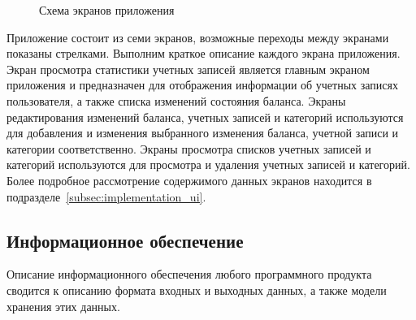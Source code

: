 \begin{figure}[h!]
  \centering
  \caption{Схема экранов приложения}
  \label{fig:design_activities}
\end{figure}

Приложение состоит из семи экранов, возможные переходы между экранами
показаны стрелками. Выполним краткое описание каждого экрана приложения.
Экран просмотра статистики учетных записей является главным экраном приложения
и предназначен для отображения информации об учетных записях пользователя,
а также списка изменений состояния баланса.
Экраны редактирования изменений баланса, учетных записей и категорий
используются для добавления и изменения выбранного изменения баланса,
учетной записи и категории соответственно.
Экраны просмотра списков учетных записей и категорий используются
для просмотра и удаления учетных записей и категорий.
Более подробное рассмотрение содержимого данных экранов находится
в подразделе~\ref{subsec:implementation_ui}.

\subsection{Информационное обеспечение}
\label{subsec:design_information}

Описание информационного обеспечения любого программного продукта сводится
к описанию формата входных и выходных данных, а также модели хранения
этих данных.

